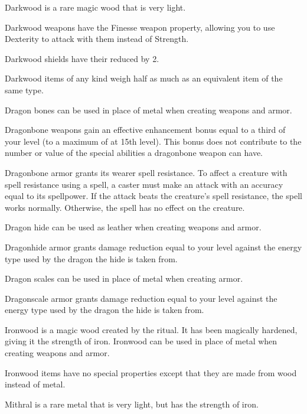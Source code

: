         Darkwood is a rare magic wood that is very light.

        Darkwood weapons have the Finesse weapon property, allowing you to use Dexterity to attack with them instead of Strength.

        Darkwood shields have their  reduced by 2.

        Darkwood items of any kind weigh half as much as an equivalent item of the same type.


        Dragon bones can be used in place of metal when creating weapons and armor.

        Dragonbone weapons gain an effective enhancement bonus equal to a third of your level (to a maximum of  at 15th level).
        This bonus does not contribute to the number or value of the special abilities a dragonbone weapon can have.

        Dragonbone armor grants its wearer spell resistance.
        To affect a creature with spell resistance using a spell, a caster must make an attack with an accuracy equal to its spellpower.
        If the attack beats the creature's spell resistance, the spell works normally.
        Otherwise, the spell has no effect on the creature.


        Dragon hide can be used as leather when creating weapons and armor.

        Dragonhide armor grants damage reduction equal to your level against the energy type used by the dragon the hide is taken from.


        Dragon scales can be used in place of metal when creating armor.

        Dragonscale armor grants damage reduction equal to your level against the energy type used by the dragon the hide is taken from.

        Ironwood is a magic wood created by the  ritual.
        It has been magically hardened, giving it the strength of iron.
        Ironwood can be used in place of metal when creating weapons and armor.

        Ironwood items have no special properties except that they are made from wood instead of metal.

        Mithral is a rare metal that is very light, but has the strength of iron.

